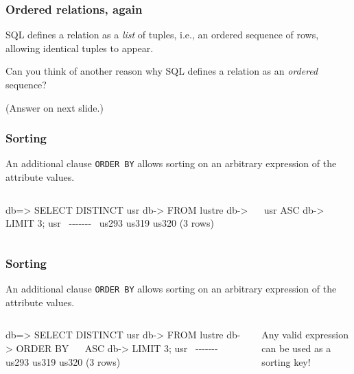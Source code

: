 \documentclass[english,serif,mathserif]{beamer}
\begin{document}
\begin{frame}[fragile]
  \frametitle{Ordered relations, again}

  SQL defines a relation as a \emph{list} of tuples, i.e., an ordered
  sequence of rows, allowing identical tuples to appear.

  \+ Can you think of another reason why SQL defines a relation as an
  \emph{ordered} sequence?

  \+
  (Answer on next slide.)
\end{frame}


\begin{frame}[fragile]
  \frametitle{Sorting}
  An additional clause \texttt{ORDER BY} allows sorting on an arbitrary
  expression of the attribute values.

  \+
  \begin{columns}
    \begin{column}{0.5\linewidth}
\begin{sql}
db=> SELECT DISTINCT usr
db-> FROM lustre
db-> ~~ usr ASC
db-> LIMIT 3;
  usr
~-{}-{}-{}-{}-{}-{}-{}~
 us293
 us319
 us320
(3 rows)
\end{sql}
    \end{column}
    \begin{column}{0.5\linewidth}

    \end{column}
  \end{columns}
\end{frame}


\begin{frame}[fragile]
  \frametitle{Sorting}
  An additional clause \texttt{ORDER BY} allows sorting on an arbitrary
  expression of the attribute values.

  \+
  \begin{columns}
    \begin{column}{0.5\linewidth}
\begin{sql}
db=> SELECT DISTINCT usr
db-> FROM lustre
db-> ORDER BY ~~ ASC
db-> LIMIT 3;
  usr
~-{}-{}-{}-{}-{}-{}-{}~
 us293
 us319
 us320
(3 rows)
\end{sql}
    \end{column}
    \begin{column}{0.5\linewidth}
      Any valid expression can be used as a sorting key!
    \end{column}
  \end{columns}
\end{frame}
\end{document}
